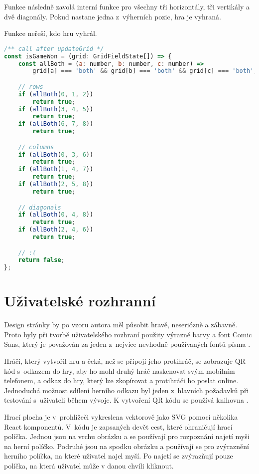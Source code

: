 Funkce  následně zavolá interní funkce  pro všechny tři
horizontály, tři vertikály a dvě diagonály. Pokud nastane jedna z~výherních
pozic, hra je vyhraná.

Funkce neřeší, kdo hru vyhrál.

\begin{lstlisting}[language=JavaScript,caption={Funkce \M{isGameWon}},label={lst:is-game-won}]
/** call after updateGrid */
const isGameWon = (grid: GridFieldState[]) => {
    const allBoth = (a: number, b: number, c: number) =>
        grid[a] === 'both' && grid[b] === 'both' && grid[c] === 'both';

    // rows
    if (allBoth(0, 1, 2))
        return true;
    if (allBoth(3, 4, 5))
        return true;
    if (allBoth(6, 7, 8))
        return true;

    // columns
    if (allBoth(0, 3, 6))
        return true;
    if (allBoth(1, 4, 7))
        return true;
    if (allBoth(2, 5, 8))
        return true;

    // diagonals
    if (allBoth(0, 4, 8))
        return true;
    if (allBoth(2, 4, 6))
        return true;

    // :(
    return false;
};
\end{lstlisting}

\section{Uživatelské rozhranní}\label{sec:user-interface}

Design stránky by po vzoru autora měl působit hravě, neseriózně a zábavně.
Proto byly při tvorbě uživatelského rozhraní použity výrazné barvy a font Comic
Sans, který je považován za jeden z~nejvíce nevhodně používaných fontů písma
\cite{seddon2011}.

Hráči, který vytvořil hru a čeká, než se připojí jeho protihráč, se zobrazuje
QR kód s~odkazem do hry, aby ho mohl druhý hráč naskenovat svým mobilním
telefonem, a odkaz do hry, který lze zkopírovat a protihráči ho poslat online.
Jednoduchá možnost sdílení herního odkazu byl jeden z~hlavních požadavků při
testování s~uživateli během vývoje. K vytvoření QR kódu se používá knihovna
 \cite{react-qr}.

Hrací plocha je v~prohlížeči vykreslena vektorově jako SVG pomocí několika
React komponentů. V~kódu je zapsaných devět cest, které ohraničují hrací
políčka. Jednou jsou na vrchu obrázku a se používají pro rozpoznání najetí myši
na herní políčko. Podruhé jsou na spodku obrázku a používají se pro zvýraznění
herního políčka, na které uživatel najel myší. Po najetí se zvýrazňují pouze
políčka, na která uživatel může v danou chvíli kliknout.
